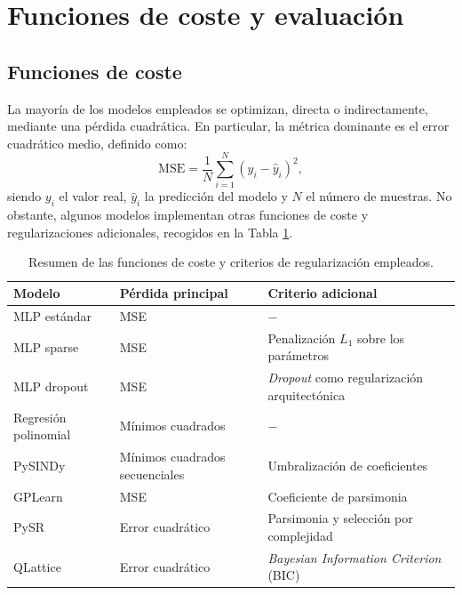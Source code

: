 \documentclass[11pt, a4paper]{article}
\begin{document}
\section{Funciones de coste y evaluación}

\subsection{Funciones de coste}

La mayoría de los modelos empleados se optimizan, directa o indirectamente, mediante una pérdida cuadrática. En particular, la métrica dominante es el error cuadrático medio, definido como:
\begin{equation}
    \mathrm{MSE} =
    \frac{1}{N}\sum_{i=1}^{N}(y_i-\hat{y}_i)^2,
    \label{eq:MSE}
\end{equation}
siendo $y_i$ el valor real, $\hat{y}_i$ la predicción del modelo y $N$ el número de muestras. No obstante, algunos modelos implementan otras funciones de coste y regularizaciones adicionales, recogidos en la Tabla \ref{tab:loss_functions}.

\FloatBarrier

\begin{table}[H]
    \centering
    \begin{tabular}{lll}
        \hline
        \textbf{Modelo} & \textbf{Pérdida principal} & \textbf{Criterio adicional} \\
        \hline
        MLP estándar & MSE & $-$ \\
        MLP sparse & MSE & Penalización $L_1$ sobre los parámetros \\
        MLP dropout & MSE & \textit{Dropout} como regularización arquitectónica \\
        Regresión polinomial & Mínimos cuadrados & $-$ \\
        PySINDy & Mínimos cuadrados secuenciales & Umbralización de coeficientes \\
        GPLearn & MSE & Coeficiente de parsimonia \\
        PySR & Error cuadrático & Parsimonia y selección por complejidad \\
        QLattice & Error cuadrático & \textit{Bayesian Information Criterion} (BIC)\\
        \hline
    \end{tabular}
    \caption{Resumen de las funciones de coste y criterios de regularización empleados.}
    \label{tab:loss_functions}
\end{table}
\end{document}
